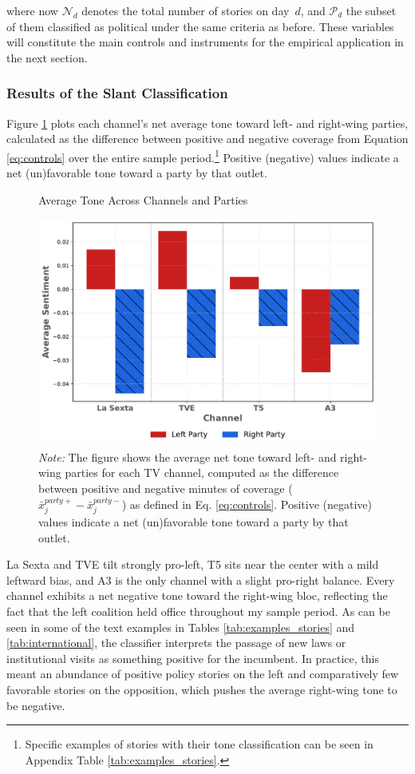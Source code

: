 \documentclass[12pt]{article}
\begin{document}
	where now \(\mathcal{N}_d\) denotes the total number of   stories on day~\(d\), and \(\mathcal{P}_d\) the subset of them classified as political under the same criteria as before. These variables will constitute the main controls and instruments for the empirical application in the next section. 
	

		\subsubsection*{Results of the Slant Classification}
	
	
	
	Figure \ref{fig:chat} plots each channel’s net average tone toward left‐ and right‐wing parties, calculated as the difference between positive and negative coverage from Equation \eqref{eq:controls} over the entire sample period.\footnote{Specific examples of stories with their tone classification can be seen in Appendix Table \ref{tab:examples_stories}.} Positive (negative) values indicate a net (un)favorable tone toward a party by that outlet. 
	
		\begin{figure}[!htbp]
		\caption{Average Tone Across Channels and Parties}
		\centering
		\includegraphics[width=120mm]{figures/chatgpt}
		\caption*{\small \textit{Note:} The figure shows the average net tone toward left- and right-wing parties for each TV channel, computed as the difference between positive and negative minutes of coverage ( $	\bar{x}_j^{party+}-\bar{x}_j^{party-}$) as defined in Eq. \eqref{eq:controls}. Positive (negative) values indicate a net (un)favorable tone toward a party by that outlet.}
		\label{fig:chat}
	\end{figure}
	
	La Sexta and TVE tilt strongly pro-left, T5 sits near the center with a mild leftward bias, and A3 is the only channel  with a slight pro-right balance. Every channel exhibits a net negative tone toward the right-wing bloc, reflecting the fact that the left coalition held office throughout my sample period. As can be seen in some of the text examples in Tables \ref{tab:examples_stories} and \ref{tab:international}, the classifier interprets the passage of new laws or institutional visits as something positive for the incumbent. In practice, this meant an abundance of positive policy stories on the left and comparatively few favorable stories on the opposition, which pushes the average right-wing tone to be negative.
	
\end{document}

